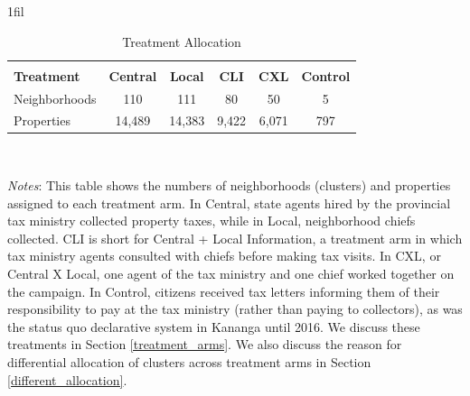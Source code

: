 \documentclass[12pt,english]{article}
\makeatletter
\renewcommand{\footnotesize}{\fontsize{9pt}{11pt}\selectfont}\usepackage[unicode=true,
\providecommand{\tabularnewline}{\\}
\newcommand*{\centerfloat}{%
  \parindent \z@
  \leftskip \z@ \@plus 1fil \@minus \textwidth
  \rightskip\leftskip
  \parfillskip \z@skip}
\makeatother
\begin{document}
\begin{table}[H]
\centering{}\caption{Treatment Allocation}
\label{tab:tmt} %
\centerfloat
\begin{lrbox}{\tablebox}
\begin{tabular}{lccccc}
  \hline
    \hline
    \\
\textbf{Treatment}  & \textbf{Central}  & \textbf{Local}  & \textbf{CLI}  & \textbf{CXL}  & \textbf{Control} \tabularnewline
\midrule 
Neighborhoods  & 110  & 111  & 80  & 50  & 5 \tabularnewline
Properties  & 14,489  & 14,383  & 9,422 & 6,071  & 797 \tabularnewline
\hline
\end{tabular}
\end{lrbox}
\usebox{\tablebox}\\[1ex]
\parbox{6in}{\footnotesize \textit{Notes}: This table shows the numbers of neighborhoods (clusters) and properties assigned to each treatment arm. In Central, state agents hired by the provincial tax ministry collected property taxes, while in Local, neighborhood chiefs collected. CLI is short for Central + Local Information, a treatment arm in which tax ministry agents consulted with chiefs before making tax visits. In CXL, or Central X Local, one agent of the tax ministry and one chief worked together on the campaign. In Control, citizens received tax letters informing them of their responsibility to pay at the tax ministry (rather than paying to collectors), as was the status quo declarative system in Kananga until 2016. We discuss these treatments in Section \ref{treatment_arms}. We also discuss the reason for differential allocation of clusters across treatment arms in Section \ref{different_allocation}.}
\end{table}


\clearpage

\end{document}
